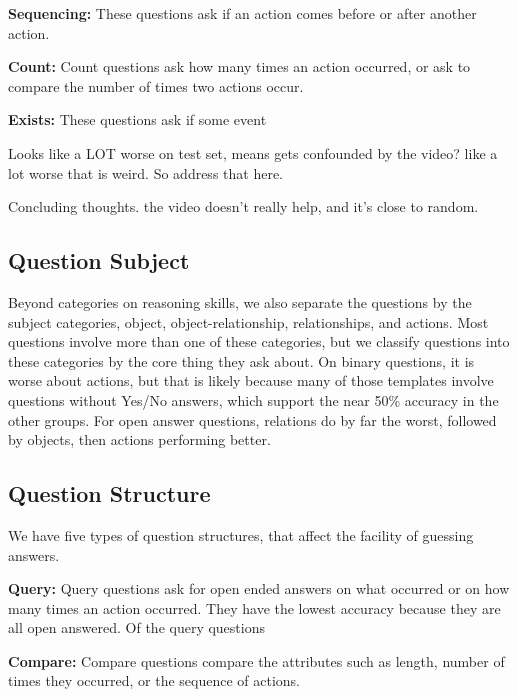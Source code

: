 \documentclass[10pt,twocolumn,letterpaper]{article}
\newcommand{\mgm}[1]{{\color{cyan}{mgm: #1}}}
\begin{document}
\textbf{Sequencing: } These questions ask if an action comes before or after another action.

\textbf{Count: } Count questions ask how many times an action occurred, or ask to compare the number of times two actions occur.

\textbf{Exists: } These questions ask if some event 

Looks like a LOT worse on test set, means gets confounded by the video? like a lot worse that is weird. So address that here.

Concluding thoughts. the video doesn't really help, and it's close to random.

\textbf{}
\subsection{Question Subject}

Beyond categories on reasoning skills, we also separate the questions by the subject categories, object, object-relationship, relationships, and actions. Most questions involve more than one of these categories, but we classify questions into these categories by the core thing they ask about. On binary questions, it is worse about actions, but that is likely because many of those templates involve questions without Yes/No answers, which support the near 50\% accuracy in the other groups. For open answer questions, relations do by far the worst, followed by objects, then actions performing better. 

\mgm{TBH I don't know if I feel comfortable reading too much into this. Often depends on the template. Action open answer template is actCount, which has a better blind accuracy than the other ones}

\subsection{Question Structure}

We have five types of question structures, that affect the facility of guessing answers. 

\textbf{Query: } Query questions ask for open ended answers on what occurred or on how many times an action occurred. They have the lowest accuracy because they are all open answered. Of the query questions \mgm{Get results on actCount vs the rest}

\textbf{Compare: } Compare questions compare the attributes such as length, number of times they occurred, or the sequence of actions. 
\end{document}
